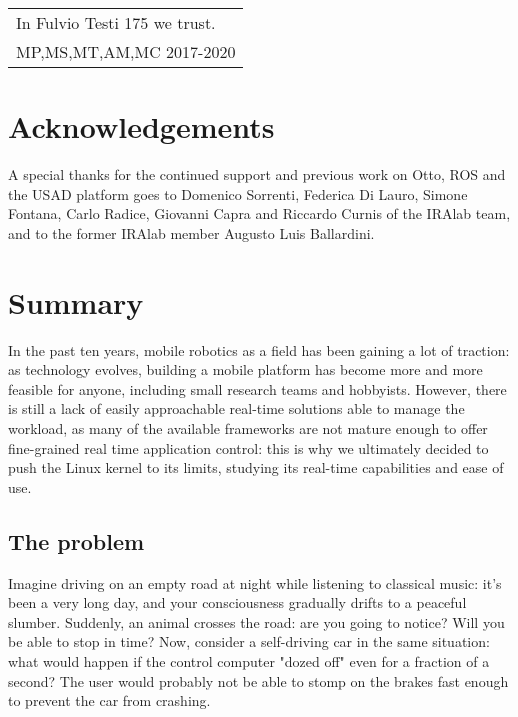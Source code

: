 \documentclass[a4paper,12pt]{report}
\begin{document}

\newpage
\begin{flushright}
  \itshape
  \begin{tabular}{@{}l@{}}
    In Fulvio Testi 175 we trust. \\
    MP,MS,MT,AM,MC 2017-2020
  \end{tabular}
\end{flushright}
\newpage
\tableofcontents
\newpage
\setlength{\parskip}{1em}
\chapter*{Acknowledgements}
A special thanks for the continued support and previous work on Otto, ROS and the USAD platform goes to Domenico Sorrenti, Federica Di Lauro, Simone Fontana, Carlo Radice, Giovanni Capra and Riccardo Curnis of the IRAlab team, and to the former IRAlab member Augusto Luis Ballardini.

\chapter{Summary}

In the past ten years, mobile robotics as a field has been gaining a lot of traction: as technology evolves, building a mobile platform has become more and more feasible for anyone, including small research teams and hobbyists. However, there is still a lack of easily approachable real-time solutions able to manage the workload, as many of the available frameworks are not mature enough to offer fine-grained real time application control: this is why we ultimately decided to push the Linux kernel to its limits, studying its real-time capabilities and ease of use.

\section{The problem}

Imagine driving on an empty road at night while listening to classical music: it's been a very long day, and your consciousness gradually drifts to a peaceful slumber. Suddenly, an animal crosses the road: are you going to notice? Will you be able to stop in time? Now, consider a self-driving car in the same situation: what would happen if the control computer "dozed off" even for a fraction of a second? The user would probably not be able to stomp on the brakes fast enough to prevent the car from crashing.
\end{document}
